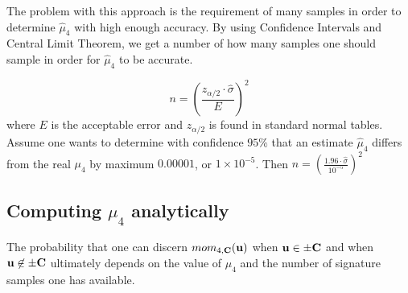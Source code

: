 The problem with this approach is the requirement of many samples in order to determine $\hat{\mu}_4$ with high enough accuracy.
By using Confidence Intervals and Central Limit Theorem, we get a number of how many samples one should sample in order for $\hat{\mu}_4$ to be accurate.

\[
    n = (\frac{z_{\alpha / 2} \cdot \hat{\sigma}}{E} )^2    
\]
where $E$ is the acceptable error and $z_{\alpha / 2}$ is found in standard normal tables.
Assume one wants to determine with confidence $95 \%$ that an estimate $\hat{\mu}_4$ differs from the real $\mu_4$ by maximum $0.00001$, or $1 \times 10^{-5}$.
Then $n = (\frac{1.96 \cdot \hat{\sigma}} {10^{-5}})^2$


\subsection{Computing $\mu_4$ analytically}
The probability that one can discern $mom_{4, \mathbf{C}}(\mathbf{u})$ when $\mathbf{u} \in \pm \mathbf{C}$ and when $\mathbf{u} \not\in \pm \mathbf{C}$ ultimately depends on the value of $\mu_4$ and the number of signature samples one has available.

